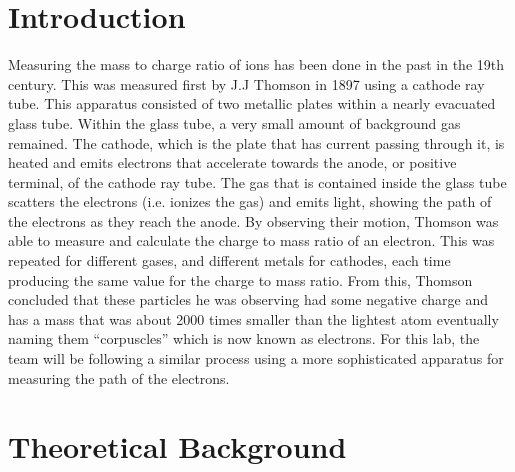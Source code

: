 \documentclass[prX,nofootinbib,notitlepage]{revtex4-1}
\begin{document}
\section{Introduction}
Measuring the mass to charge ratio of ions has been done in the past in the 19th century. This was measured first by J.J Thomson in 1897 using a cathode ray tube. This apparatus consisted of two metallic plates within a nearly evacuated glass tube. Within the glass tube, a very small amount of background gas remained. The cathode, which is the plate that has current passing through it, is heated and emits electrons that accelerate towards the anode, or positive terminal, of the cathode ray tube. The gas that is contained inside the glass tube scatters the electrons (i.e. ionizes the gas) and emits light, showing the path of the electrons as they reach the anode. By observing their motion, Thomson was able to measure and calculate the charge to mass ratio of an electron. This was repeated for different gases, and different metals for cathodes, each time producing the same value for the charge to mass ratio. From this, Thomson concluded that these particles he was observing had some negative charge and has a mass that was about 2000 times smaller than the lightest atom eventually naming them “corpuscles” which is now known as electrons. For this lab, the team will be following a similar process using a more sophisticated apparatus for measuring the path of the electrons.

\section{Theoretical Background} \label{Theoretical Background}
\end{document}
